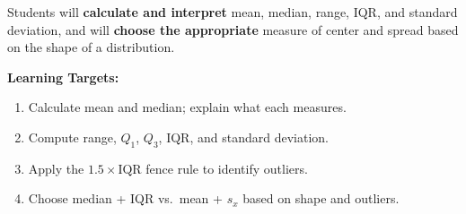 \documentclass[aspectratio=169, 11pt]{beamer}
\begin{document}
{
\begin{frame}[t, plain]
  \vspace{0.45cm}\par
  \hspace{0.55cm}%
  \begin{minipage}{0.9\textwidth}


    \normalsize
    Students will \textbf{calculate and interpret} mean, median, range, IQR,
    and standard deviation, and will \textbf{choose the appropriate} measure of
    center and spread based on the shape of a distribution.

    \vspace{0.5cm}
    \textbf{Learning Targets:}
    \begin{enumerate}\small
      \setlength{\itemsep}{0.4em}
      \item Calculate mean and median; explain what each measures.
      \item Compute range, $Q_1$, $Q_3$, IQR, and standard deviation.
      \item Apply the $1.5\times\text{IQR}$ fence rule to identify outliers.
      \item Choose median + IQR vs.\ mean + $s_x$ based on shape and outliers.
    \end{enumerate}
  \end{minipage}
\end{frame}
}
\end{document}
